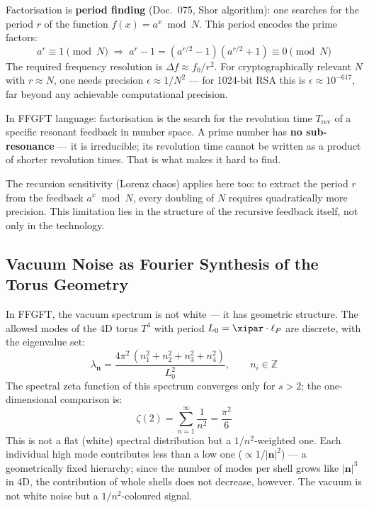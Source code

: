 \begin{technical}
Factorisation is \textbf{period finding} (Doc.~075, Shor algorithm): one searches
for the period $r$ of the function $f(x) = a^x \bmod N$. This period encodes
the prime factors:
\begin{equation}
    a^r \equiv 1 \pmod{N}
    \;\Rightarrow\;
    a^r - 1 = (a^{r/2}-1)(a^{r/2}+1) \equiv 0 \pmod{N}
\end{equation}
The required frequency resolution is $\Delta f \approx f_0/r^2$. For
cryptographically relevant $N$ with $r \approx N$, one needs precision
$\epsilon \approx 1/N^2$ — for 1024-bit RSA this is $\epsilon \approx 10^{-617}$,
far beyond any achievable computational precision.

In FFGFT language: factorisation is the search for the revolution time $T_\text{rev}$
of a specific resonant feedback in number space. A prime number has
\textbf{no sub-resonance} — it is irreducible; its revolution time cannot be
written as a product of shorter revolution times. That is what makes it hard to find.

The recursion sensitivity (Lorenz chaos) applies here too: to extract the period
$r$ from the feedback $a^x \bmod N$, every doubling of $N$ requires quadratically
more precision. This limitation lies in the structure of the
recursive feedback itself, not only in the technology.
\end{technical}


\subsection{Vacuum Noise as Fourier Synthesis of the Torus Geometry}

In FFGFT, the vacuum spectrum is not white — it has geometric structure.
The allowed modes of the 4D torus $T^4$ with period $L_0 = \xipar \cdot \ell_P$
are discrete, with the eigenvalue set:
\begin{equation}
    \lambda_\mathbf{n} = \frac{4\pi^2\,(n_1^2 + n_2^2 + n_3^2 + n_4^2)}{L_0^2},
    \qquad n_i \in \mathbb{Z}
\end{equation}
The spectral zeta function of this spectrum converges only for $s > 2$;
the one-dimensional comparison is:
\begin{equation}
    \zeta(2) = \sum_{n=1}^{\infty} \frac{1}{n^2} = \frac{\pi^2}{6}
\end{equation}
This is not a flat (white) spectral distribution but a $1/n^2$-weighted one.
Each individual high mode contributes less than a low one ($\propto 1/|\mathbf{n}|^2$) — a geometrically fixed
hierarchy; since the number of modes per shell grows like $|\mathbf{n}|^3$ in 4D, the contribution of whole shells does not decrease, however.
The vacuum is not white noise but a $1/n^2$-coloured signal.

